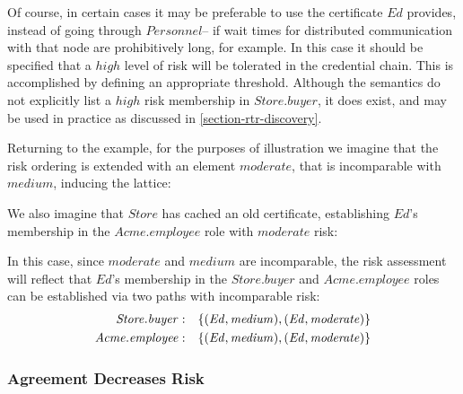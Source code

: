 Of course, in certain cases it may be preferable to use the
certificate $\mathit{Ed}$ provides, instead of going through
$\mathit{Personnel}$-- if wait times for distributed communication
with that node are prohibitively long, for example.  In this case it
should be specified that a $\mathit{high}$ level of risk will be
tolerated in the credential chain.  This is accomplished by defining
an appropriate threshold.  Although the semantics do not explicitly
list a $\mathit{high}$ risk membership in $\mathit{Store.buyer}$, it
does exist, and may be used in practice as discussed in
\autoref{section-rtr-discovery}.

Returning to the example, for the purposes of illustration we imagine
that the risk ordering is extended with an element $\mathit{moderate}$,
that is incomparable with $\mathit{medium}$, inducing the lattice:
\begin{center}
\risklattice
\end{center}
We also imagine that $\mathit{Store}$ has cached an old certificate,
establishing $\mathit{Ed}$'s membership in the $\mathit{Acme.employee}$
role with $\mathit{moderate}$ risk:
\begin{mathpar}
\end{mathpar}
In this case, since $\mathit{moderate}$ and $\mathit{medium}$ are 
incomparable, the risk assessment will reflect that $\mathit{Ed}$'s
membership in the $\mathit{Store.buyer}$ and $\mathit{Acme.employee}$
roles can be established via two paths with incomparable risk:
\begin{eqnarray*}
\mathit{Store.buyer}&:& \setdefn{(\mathit{Ed, medium}),(\mathit{Ed, moderate})}\\
\mathit{Acme.employee}&:& \setdefn{(\mathit{Ed, medium}),(\mathit{Ed, moderate})}
\end{eqnarray*}

\subsubsection{Agreement Decreases Risk}

